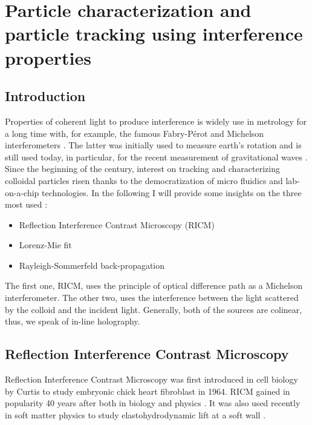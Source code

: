 \newpage
\section{Particle characterization and particle tracking using interference properties}
		\label{sec:chapter2}

\subsection{Introduction}

Properties of coherent light to produce interference is widely use in metrology for a long time with, for example, the famous Fabry-Pérot  \cite{fabry_theorie_1899, perot_application_1899} and Michelson interferometers \cite{michelson_relative_1887}. The latter was initially used to measure earth's rotation and is still used today, in particular, for the recent measurement of gravitational waves
\cite{ligo_scientific_collaboration_and_virgo_collaboration_gw151226_2016}. 
Since the beginning of the century, interest on tracking and characterizing colloidal particles risen thanks to the democratization of micro fluidics and lab-on-a-chip technologies. In the following I will provide some insights on the three most used :

\begin{itemize}
	\item Reflection Interference Contrast Microscopy (\gls{RICM})
	\item Lorenz-Mie fit
	\item Rayleigh-Sommerfeld back-propagation
\end{itemize}

The first one, \gls{RICM}, uses the principle of optical difference path as a Michelson interferometer. The other two, uses the interference between the light scattered by the colloid and the incident light. Generally, both of the sources are colinear, thus, we speak of in-line holography. 



\subsection{Reflection Interference Contrast Microscopy}




Reflection Interference Contrast Microscopy was first introduced in cell biology by Curtis to study embryonic chick heart fibroblast \cite{curtis_mechanism_1964} in 1964. \gls{RICM} gained in popularity 40 years after both in biology and physics \cite{filler_reflection_2000, siver_use_2000, weber_2_2003, limozin_quantitative_2009, nadal_probing_2002, raedler_measurement_1992}. It was also used recently in soft matter physics to study elastohydrodynamic lift at a soft wall \cite{davies_elastohydrodynamic_2018}.

